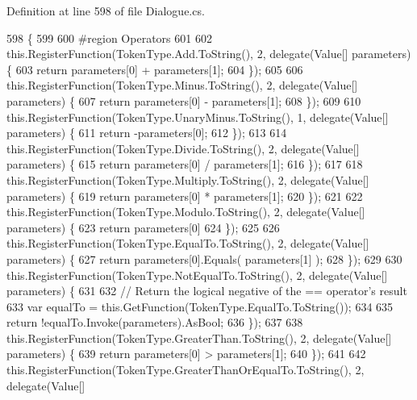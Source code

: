 Definition at line 598 of file Dialogue.\-cs.


\begin{DoxyCode}
598                                      \{
599 
600 \textcolor{preprocessor}{                #region Operators}
601 \textcolor{preprocessor}{}
602                 this.RegisterFunction(TokenType.Add.ToString(), 2, delegate(Value[] parameters) \{
603                     \textcolor{keywordflow}{return} parameters[0] + parameters[1];
604                 \});
605 
606                 this.RegisterFunction(TokenType.Minus.ToString(), 2, delegate(Value[] parameters) \{
607                     \textcolor{keywordflow}{return} parameters[0] - parameters[1];
608                 \});
609 
610                 this.RegisterFunction(TokenType.UnaryMinus.ToString(), 1, delegate(Value[] parameters) \{
611                     \textcolor{keywordflow}{return} -parameters[0];
612                 \});
613 
614                 this.RegisterFunction(TokenType.Divide.ToString(), 2, delegate(Value[] parameters) \{
615                     \textcolor{keywordflow}{return} parameters[0] / parameters[1];
616                 \});
617 
618                 this.RegisterFunction(TokenType.Multiply.ToString(), 2, delegate(Value[] parameters) \{
619                     \textcolor{keywordflow}{return} parameters[0] * parameters[1];
620                 \});
621 
622                 this.RegisterFunction(TokenType.Modulo.ToString(), 2, delegate(Value[] parameters) \{
623                     \textcolor{keywordflow}{return} parameters[0] %
624                 \});
625 
626                 this.RegisterFunction(TokenType.EqualTo.ToString(), 2, delegate(Value[] parameters) \{
627                     \textcolor{keywordflow}{return} parameters[0].Equals( parameters[1] );
628                 \});
629 
630                 this.RegisterFunction(TokenType.NotEqualTo.ToString(), 2, delegate(Value[] parameters) \{
631 
632                     \textcolor{comment}{// Return the logical negative of the == operator's result}
633                     var equalTo = this.GetFunction(TokenType.EqualTo.ToString());
634 
635                     \textcolor{keywordflow}{return} !equalTo.Invoke(parameters).AsBool;
636                 \});
637 
638                 this.RegisterFunction(TokenType.GreaterThan.ToString(), 2, delegate(Value[] parameters) \{
639                     \textcolor{keywordflow}{return} parameters[0] > parameters[1];
640                 \});
641 
642                 this.RegisterFunction(TokenType.GreaterThanOrEqualTo.ToString(), 2, delegate(Value[] 

\end{DoxyCode}
